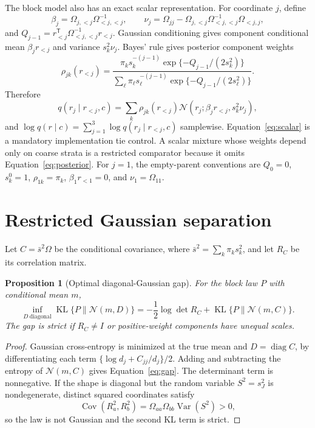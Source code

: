 \documentclass[11pt]{article}
\newtheorem{proposition}{Proposition}[section]
\DeclareMathOperator{\KL}{KL}
\begin{document}
The block model also has an exact scalar representation.  For coordinate $j$, define
\begin{equation}
 \beta_j=\Omega_{j,<j}\Omega_{<j,<j}^{-1},\qquad
 \nu_j=\Omega_{jj}-\Omega_{j,<j}\Omega_{<j,<j}^{-1}\Omega_{<j,j},
 \label{eq:schur}
\end{equation}
and $Q_{j-1}=r_{<j}^{\mathsf T}\Omega_{<j,<j}^{-1}r_{<j}$.  Gaussian conditioning gives component conditional mean $\beta_jr_{<j}$ and variance $s_k^2\nu_j$.  Bayes' rule gives posterior component weights
\begin{equation}
 \rho_{jk}(r_{<j})=
 \frac{\pi_ks_k^{-(j-1)}\exp\{-Q_{j-1}/(2s_k^2)\}}
 {\sum_\ell\pi_\ell s_\ell^{-(j-1)}\exp\{-Q_{j-1}/(2s_\ell^2)\}}.
 \label{eq:posterior}
\end{equation}
Therefore
\begin{equation}
 q(r_j\mid r_{<j},c)=\sum_k\rho_{jk}(r_{<j})
 \mathcal N\!\left(r_j;\beta_jr_{<j},s_k^2\nu_j\right),
 \label{eq:scalar}
\end{equation}
and $\log q(r\mid c)=\sum_{j=1}^{3}\log q(r_j\mid r_{<j},c)$ samplewise.  Equation~\eqref{eq:scalar} is a mandatory implementation tie control.  A scalar mixture whose weights depend only on coarse strata is a restricted comparator because it omits Equation~\eqref{eq:posterior}.
For $j=1$, the empty-parent conventions are $Q_0=0$, $s_k^0=1$, $\rho_{1k}=\pi_k$, $\beta_1r_{<1}=0$, and $\nu_1=\Omega_{11}$.

\section{Restricted Gaussian separation}

Let $C=\bar s^2\Omega$ be the conditional covariance, where $\bar s^2=\sum_k\pi_ks_k^2$, and let $R_C$ be its correlation matrix.

\begin{proposition}[Optimal diagonal-Gaussian gap]
For the block law $P$ with conditional mean $m$,
\begin{equation}
 \inf_{D\ \mathrm{diagonal}}\KL\{P\|\mathcal N(m,D)\}
 =-\frac12\log\det R_C+\KL\{P\|\mathcal N(m,C)\}.
 \label{eq:gap}
\end{equation}
The gap is strict if $R_C\ne I$ or positive-weight components have unequal scales.
\end{proposition}

\begin{proof}
Gaussian cross-entropy is minimized at the true mean and $D=\operatorname{diag}C$, by differentiating each term $\{\log d_j+C_{jj}/d_j\}/2$.  Adding and subtracting the entropy of $\mathcal N(m,C)$ gives Equation~\eqref{eq:gap}.  The determinant term is nonnegative.  If the shape is diagonal but the random variable $S^2=s_J^2$ is nondegenerate, distinct squared coordinates satisfy
\[
 \operatorname{Cov}(R_a^2,R_b^2)=\Omega_{aa}\Omega_{bb}\operatorname{Var}(S^2)>0,
\]
so the law is not Gaussian and the second KL term is strict.
\end{proof}
\end{document}
